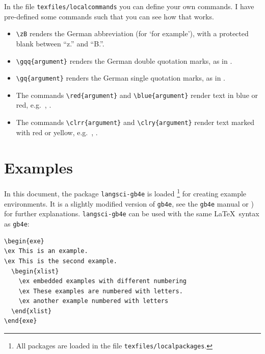 In the file \texttt{texfiles/localcommands} you can define your own commands. I have pre-defined some commands such that you can see how that works.

\begin{itemize}
	\item \verb|\zB| renders the German abbreviation \zB (for `for example'), with a protected blank between ``z.'' and ``B.''.
	
	\item \verb||  renders the German double quotation marks, as in \gqq{argument}.
	
	\item \verb||  renders the German single quotation marks, as in \gq{argument}.
	
	\item The commands \verb|\red{argument}| and \verb|\blue{argument}| render text in blue or red, e.g.\ , .
	
	\item The commands \verb|\clrr{argument}| and \verb|\clry{argument}| render text marked with red  or yellow, e.g.\ , .
\end{itemize}


\section{Examples}
\label{ch:Examples}


In this document, the package \texttt{langsci-gb4e} is loaded%
	\footnote{All packages are loaded in the file \texttt{texfiles/localpackages}.} %
for creating example environments.
It is a slightly modified version of \texttt{gb4e}, see the \texttt{gb4e} manual \citep{Kolb&Co10a} or \citet{Freitag&MyP15a}) for further explanations.
\texttt{langsci-gb4e} can be used with the same \LaTeX \ syntax as \texttt{gb4e}:


\begin{lstlisting}
\begin{exe}
\ex This is an example.
\ex This is the second example.
  \begin{xlist}
    \ex embedded examples with different numbering
    \ex These examples are numbered with letters.
    \ex another example numbered with letters
  \end{xlist}
\end{exe}
\end{lstlisting}


